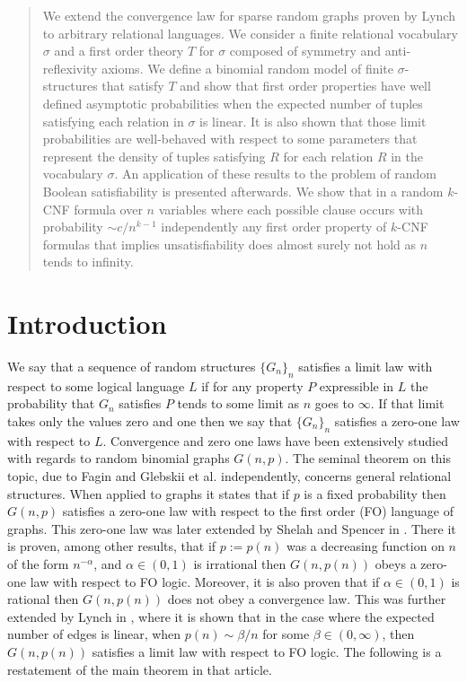 \documentclass[12pt,notitlepage,a4paper]{article}
\theoremstyle{definition}
\begin{document}
\begin{abstract}
	We extend the convergence law for sparse random graphs proven
	by Lynch to arbitrary relational languages.
	We consider a finite relational vocabulary $\sigma$
	and a first order theory $T$ for $\sigma$ 
    composed of symmetry and 
    anti-reflexivity axioms. We define a binomial random model of finite 
    $\sigma$-structures that satisfy $T$ and show that first order properties have 
    well defined asymptotic probabilities when the expected number of tuples satisfying
    each relation in $\sigma$ is linear.
    It is also shown that those limit probabilities are well-behaved with
    respect to some parameters that represent the density of tuples satisfying $R$
    for each relation $R$ in the vocabulary $\sigma$. 
    An application of these results to the problem of random Boolean 
    satisfiability is presented afterwards. 
    We show that in a random $k$-CNF formula over $n$ variables where
    each possible clause occurs with probability $\sim c/n^{k-1}$ independently any 
    first order property of $k$-CNF formulas that
    implies unsatisfiability does almost surely not hold as $n$ tends to infinity.
   
\end{abstract}
\clearpage

\section*{Introduction}

We say that a sequence of random structures $\{G_n\}_n$ satisfies a limit
law with respect to some logical language $L$ if for any property $P$ expressible in
$L$ the probability that $G_n$ satisfies $P$ tends to some limit as $n$ goes to $\infty$.
If that limit takes only the values zero and one then we say that $\{G_n\}_n$ satisfies
a zero-one law with respect to $L$.  
Convergence and zero one laws have been extensively studied with regards to 
random binomial graphs $G(n,p)$.
The seminal theorem on this topic, due to Fagin \cite{fagin1976probabilities}
and Glebskii et al. \cite{glebskii1969range} independently, 
concerns general relational structures.
When applied to graphs it states that if $p$ is a fixed probability
then $G(n,p)$ satisfies a zero-one law with respect to the first order
(FO) language of graphs. This zero-one law was later extended by Shelah and Spencer
in \cite{shelah1988zero}. There it is proven, among other results,
that if $p:=p(n)$ was a decreasing function on
$n$ of the form $n^{-\alpha}$, and $\alpha\in (0,1)$ is irrational
then $G(n,p(n))$ obeys a zero-one law with respect to FO logic. Moreover, 
it is also proven that if $\alpha\in (0,1)$ is rational then $G(n,p(n))$ 
does not obey a convergence law. This was further extended by Lynch
in \cite{lynch1992probabilities}, where it is shown that in the
case where the expected number of edges is linear, when $p(n)\sim \beta/n$
for some $\beta\in (0,\infty)$, then $G(n,p(n))$ satisfies a limit law with
respect to FO logic. The following is a restatement of the main theorem
in that article.
\end{document}
